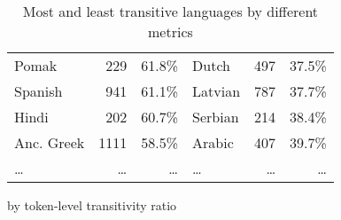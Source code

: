 \begin{table}[ht]
\begin{subtable}[c]{\textwidth}
\begin{tabular}{lrr|lrr}
        Pomak & 229 & 61.8\% & Dutch & 497 & 37.5\% \\
        Spanish & 941 & 61.1\% & Latvian & 787 & 37.7\% \\
        Hindi & 202 & 60.7\% & Serbian & 214 & 38.4\% \\
        Anc. Greek & 1111 & 58.5\% & Arabic & 407 & 39.7\% \\
        \dots & \dots & \dots & \dots & \dots & \dots \\
        \bottomrule
      \end{tabular}
      \caption{by token-level transitivity ratio}
      \label{tab:table2}
    \end{subtable}
    \caption{Most and least transitive languages by different metrics}
    \label{tab:combined}
  \end{table}